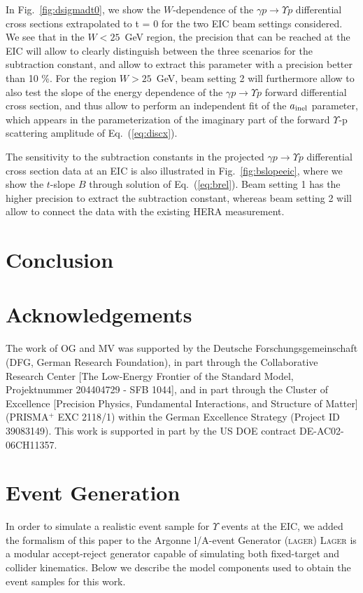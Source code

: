 \documentclass[prd,amsmath,%
twocolumn,floatfix,amssymb, preprintnumbers, nofootinbib, superscriptaddress]{revtex4}
\begin{document}
In Fig.~\ref{fig:dsigmadt0}, we show the $W$-dependence of the $\gamma p \to \Upsilon p$ differential cross sections extrapolated to t = 0 for the two EIC beam settings considered.  
We see that in the $W < 25$~GeV region, the precision that can be reached at the EIC will allow to clearly distinguish between the three scenarios for the subtraction constant, and allow to extract this parameter with a precision better than 10 \%. For the region $W > 25$~GeV, beam setting 2 will furthermore allow to also test the slope of the energy dependence of the $\gamma p \to \Upsilon p$ forward differential cross section, and thus allow to perform an independent fit of the $a_{\rm inel}$ parameter, which appears in the parameterization of the imaginary part of the forward $\Upsilon$-p scattering amplitude of Eq.~(\ref{eq:discx}). 

The sensitivity to the subtraction constants in the 
projected $\gamma p \to \Upsilon p$ differential cross section data at an EIC is also illustrated in Fig.~\ref{fig:bslopeeic}, where we show the $t$-slope $B$ through solution of Eq.~(\ref{eq:brel}).  
Beam setting 1 has the higher precision to extract the subtraction constant, whereas beam setting 2 will allow to connect the data with the existing HERA measurement. 

\section{Conclusion}

\newpage


\section*{Acknowledgements}
The work of OG and MV was supported by the Deutsche Forschungsgemeinschaft (DFG, German Research Foundation),
in part through the Collaborative Research Center [The Low-Energy Frontier of the Standard
Model, Projektnummer 204404729 - SFB 1044], and in part through the Cluster of Excellence
[Precision Physics, Fundamental Interactions, and Structure of Matter] (PRISMA$^+$ EXC
2118/1) within the German Excellence Strategy (Project ID 39083149).
This work is supported in part by the US DOE contract DE-AC02-06CH11357.



\appendix

\section{Event Generation\label{apx-evgen}}
In order to simulate a realistic event sample for $\Upsilon$ events at the EIC,
we added the formalism of this paper to the Argonne l/A-event Generator (\textsc{lager}) \cite{git:lager}
\textsc{Lager} is a modular accept-reject generator capable of simulating both fixed-target and collider kinematics. Below we describe the model components used to obtain the event samples for this work.
\end{document}
